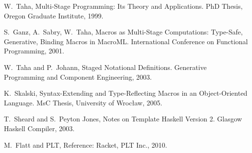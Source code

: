 \documentclass[10pt,journal,a4paper]{IEEEtran}
\begin{document}
\begin{thebibliography}{99}
W.~Taha,
Multi-Stage Programming: Its Theory and Applications.
PhD Thesis, Oregon Graduate Institute, 1999.

S.~Ganz, A.~Sabry, W.~Taha,
Macros as Multi-Stage Computations: Type-Safe, Generative, Binding Macros in MacroML.
International Conference on Functional Programming, 2001.

W.~Taha and P.~Johann,
Staged Notational Definitions.
Generative Programming and Component Engineering, 2003.

K.~Skalski,
Syntax-Extending and Type-Reflecting Macros in an Object-Oriented Language.
MsC Thesis, University of Wroc{\l}aw, 2005.

T.~Sheard and S.~Peyton Jones,
Notes on Template Haskell Version 2.
Glasgow Haskell Compiler, 2003.

M.~Flatt and PLT,
Reference: Racket,
PLT Inc., 2010.

\end{thebibliography}
\end{document}

